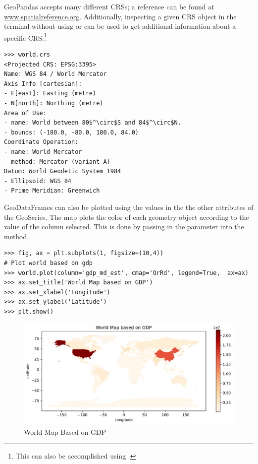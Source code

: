 GeoPandas accepts many different CRSs; a reference can be found at \url{www.spatialreference.org}.
Additionally, inspecting a given CRS object in the terminal without using  or  can be used to get additional information about a specific CRS:\footnote{This can also be accomplished using .}
\begin{lstlisting}[mathescape]
>>> world.crs
<Projected CRS: EPSG:3395>
Name: WGS 84 / World Mercator
Axis Info [cartesian]:
- E[east]: Easting (metre)
- N[north]: Northing (metre)
Area of Use:
- name: World between 80$^\circ$S and 84$^\circ$N.
- bounds: (-180.0, -80.0, 180.0, 84.0)
Coordinate Operation:
- name: World Mercator
- method: Mercator (variant A)
Datum: World Geodetic System 1984
- Ellipsoid: WGS 84
- Prime Meridian: Greenwich
\end{lstlisting}

GeoDataFrames can also be plotted using the values in the the other attributes of the GeoSeries.
The map plots the color of each geometry object according to the value of the column selected.
This is done by passing in the parameter  into the  method.

\begin{lstlisting}
>>> fig, ax = plt.subplots(1, figsize=(10,4))
# Plot world based on gdp
>>> world.plot(column='gdp_md_est', cmap='OrRd', legend=True,  ax=ax)
>>> ax.set_title('World Map based on GDP')
>>> ax.set_xlabel('Longitude')
>>> ax.set_ylabel('Latitude')
>>> plt.show()
\end{lstlisting}

\begin{figure}[H]
\begin{center}
\includegraphics[scale=.7]{figures/gdp.pdf}
\end{center}
\caption{World Map Based on GDP}
\label{figure:gdp_map}
\end{figure}


